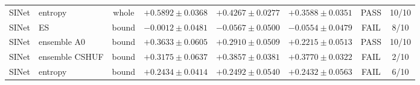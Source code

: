 \begin{table}[h]
\begin{center}
\begin{tabular}{llcccccc}
SINet & entropy & whole & $+0.5892 \pm 0.0368$ & $+0.4267 \pm 0.0277$ & $+0.3588 \pm 0.0351$ & PASS & 10/10 \\
SINet & ES & bound & $-0.0012 \pm 0.0481$ & $-0.0567 \pm 0.0500$ & $-0.0554 \pm 0.0479$ & FAIL & 8/10 \\
SINet & ensemble A0 & bound & $+0.3633 \pm 0.0605$ & $+0.2910 \pm 0.0509$ & $+0.2215 \pm 0.0513$ & PASS & 10/10 \\
SINet & ensemble CSHUF & bound & $+0.3175 \pm 0.0637$ & $+0.3857 \pm 0.0381$ & $+0.3770 \pm 0.0322$ & FAIL & 2/10 \\
SINet & entropy & bound & $+0.2434 \pm 0.0414$ & $+0.2492 \pm 0.0540$ & $+0.2432 \pm 0.0563$ & FAIL & 6/10 \\
\bottomrule
\end{tabular}
\end{center}
\end{table}

